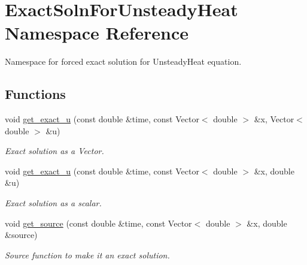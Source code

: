 \hypertarget{namespaceExactSolnForUnsteadyHeat}{}\section{Exact\+Soln\+For\+Unsteady\+Heat Namespace Reference}
\label{namespaceExactSolnForUnsteadyHeat}


Namespace for forced exact solution for Unsteady\+Heat equation.  


\subsection*{Functions}
\begin{DoxyCompactItemize}
\item 
void \hyperlink{namespaceExactSolnForUnsteadyHeat_a1d5b22857bd2a7825397daf1cf9c89eb}{get\+\_\+exact\+\_\+u} (const double \&time, const Vector$<$ double $>$ \&x, Vector$<$ double $>$ \&u)
\begin{DoxyCompactList}\small\item\em Exact solution as a Vector. \end{DoxyCompactList}\item 
void \hyperlink{namespaceExactSolnForUnsteadyHeat_a36e38a9c0c7c0bf8916e2d86ac75b4e2}{get\+\_\+exact\+\_\+u} (const double \&time, const Vector$<$ double $>$ \&x, double \&u)
\begin{DoxyCompactList}\small\item\em Exact solution as a scalar. \end{DoxyCompactList}\item 
void \hyperlink{namespaceExactSolnForUnsteadyHeat_ab4e853d6368b1fcdbd6205079687455a}{get\+\_\+source} (const double \&time, const Vector$<$ double $>$ \&x, double \&source)
\begin{DoxyCompactList}\small\item\em Source function to make it an exact solution. \end{DoxyCompactList}\end{DoxyCompactItemize}
